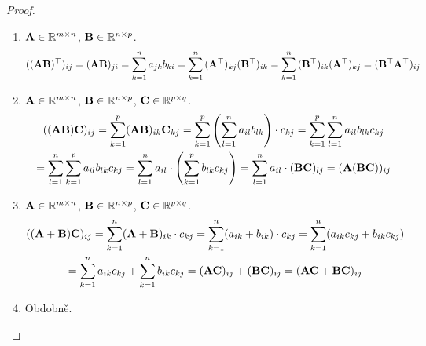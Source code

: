 \begin{proof}
    \leavevmode
    \begin{enumerate}
        \item
            $\mathbf{A} \in \mathbb{R}^{m \times n}$, $\mathbf{B} \in \mathbb{R}^{n \times p}$.
            $$((\mat{A}\mat{B})^\top)_{ij} 
                    = (\mat{A}\mat{B})_{ji} %
                    = \sum_{k=1}^{n}{a_{jk}b_{ki}} 
                    =
                \sum_{k=1}^{n}{(\mat{A}^\top)_{kj}(\mat{B}^\top)_{ik}} 
                    = 
                \sum_{k=1}^{n}{(\mat{B}^\top)_{ik}(\mat{A}^\top)_{kj}} %
                    = (\mat{B}^\top\mat{A}^\top)_{ij}$$
        \item
            $\mathbf{A} \in \mathbb{R}^{m \times n}$, $\mathbf{B} \in \mathbb{R}^{n \times p}$, $\mathbf{C} \in \mathbb{R}^{p \times q}$.
            \begin{multline*}
                ((\mat{A}\mat{B})\mat{C})_{ij} 
                    =\sum_{k=1}^{p}(\mat{A}\mat{B})_{ik}\mat{C}_{kj} %
                    =\sum_{k=1}^{p} \left(\sum_{l=1}^{n}
            a_{il}b_{lk}\right) \cdot c_{kj} 
                    =\sum_{k=1}^{p}{\sum_{l=1}^{n}{a_{il}b_{lk}c_{kj}}} \\
                    =\sum_{l=1}^{n}{\sum_{k=1}^{p}{a_{il}b_{lk}c_{kj}}} 
                    =\sum_{l=1}^{n}a_{il}\cdot
                        \left(\sum_{k=1}^{p}{b_{lk}c_{kj}}\right) %
                        =\sum_{l=1}^{n}a_{il}\cdot(\mat{B}\mat{C})_{lj} 
                        =(\mat{A}(\mat{B}\mat{C}))_{ij}
                    \end{multline*}
        \item
            $\mathbf{A} \in \mathbb{R}^{m \times n}$, $\mathbf{B} \in \mathbb{R}^{n \times p}$, $\mathbf{C} \in \mathbb{R}^{p \times q}$.
            \begin{multline*}
                ((\mathbf{A}+\mathbf{B})\mathbf{C})_{ij} 
                = \sum_{k=1}^{n}(\mathbf{A}+\mathbf{B})_{ik}\cdot c_{kj} 
                = \sum_{k=1}^{n} (a_{ik} + b_{ik}) \cdot c_{kj} 
                = \sum_{k=1}^{n} (a_{ik}c_{kj} + b_{ik}c_{kj}) \\
                = \sum_{k=1}^{n} a_{ik}c_{kj} + \sum_{k=1}^{n} b_{ik}c_{kj}
                = (\mathbf{A}\mathbf{C})_{ij} + (\mathbf{B}\mathbf{C})_{ij} 
                = (\mathbf{A}\mathbf{C} + \mathbf{B}\mathbf{C})_{ij}
            \end{multline*}
        \item
            Obdobně.
    \end{enumerate}
\end{proof}

